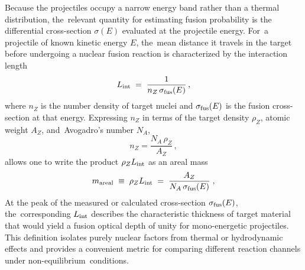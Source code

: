 \documentclass[particles,article,accept,pdftex,moreauthors]{Definitions/mdpi}
\begin{document}
Because the projectiles occupy a narrow energy band rather than a thermal distribution, the~relevant quantity for estimating fusion probability is the differential cross-section $\sigma(E)$ evaluated at the projectile energy. For~a projectile of known kinetic energy $E$, the~mean distance it travels in the target before undergoing a nuclear fusion reaction is characterized by the interaction length
\begin{equation}
 L_{\rm int}
 \;=\;
 \frac{1}{n_{Z}\,\sigma_{\rm fus}(E)} \, ,
 \label{eq:Lint}
\end{equation}
where $n_{Z}$ is the number density of target nuclei and $\sigma_{\rm fus}(E)$ is the fusion cross-section at that energy. Expressing $n_Z$ in terms of the target density $\rho_Z$, atomic weight $A_Z$, and~Avogadro's number $N_A$,
\begin{equation}
n_{Z} = \frac{N_A\,\rho_Z}{A_Z}\,,
\end{equation}
allows one to write the product $\rho_Z L_{\rm int}$ as an areal mass
\begin{equation}
 m_{\rm areal}
 \;\equiv\;
 \rho_Z L_{\rm int}
 \;=\;
 \frac{A_Z}{N_A\,\sigma_{\rm fus}(E)} 
 \;,
 \label{eq:m_areal}
\end{equation}
At the peak of the measured or calculated cross-section $\sigma_{\rm fus}(E)$, the~corresponding $L_{\rm int}$ describes the characteristic thickness of target material that would yield a fusion optical depth of unity for mono-energetic projectiles. This definition isolates purely nuclear factors from thermal or hydrodynamic effects and provides a convenient metric for comparing different reaction channels under non-equilibrium~conditions.
\end{document}
